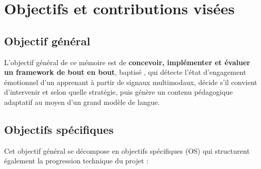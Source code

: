 \section{Objectifs et contributions visées}
\label{sec:objectifs}

\subsection*{Objectif général}

L'objectif général de ce mémoire est de \textbf{concevoir, implémenter et
évaluer un framework de bout en bout}, baptisé \emolearn{}, qui détecte l'état
d'engagement émotionnel d'un apprenant à partir de signaux multimodaux, décide
s'il convient d'intervenir et selon quelle stratégie, puis génère un contenu
pédagogique adaptatif au moyen d'un grand modèle de langue.

\subsection*{Objectifs spécifiques}

Cet objectif général se décompose en objectifs spécifiques (OS) qui structurent
également la progression technique du projet :

